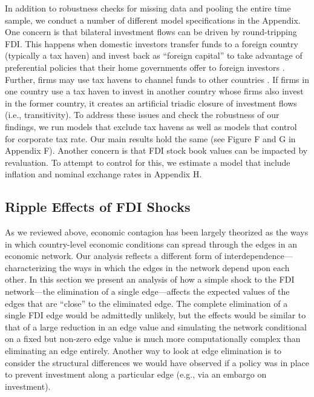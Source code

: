 \documentclass[reqno,onecolumn,letterpaper,12pt]{article}
\begin{document}
In addition to robustness checks for missing data and pooling the entire time sample, we conduct a number of different model specifications in the Appendix. One concern is that bilateral investment flows can be driven by round-tripping FDI. This happens when domestic investors transfer funds to a foreign country (typically a tax haven) and invest back as ``foreign capital'' to take advantage of preferential policies that their home governments offer to foreign investors \citep{Borga:2016}. Further, firms may use tax havens to channel funds to other countries \citep{Borga:2017}. If firms in one country use a tax haven to invest in another country whose firms also invest in the former country, it creates an artificial triadic closure of investment flows (i.e., transitivity). To address these issues and check the robustness of our findings, we run models that exclude tax havens as well as models that control for corporate tax rate. Our main results hold the same (see Figure F and G in Appendix F). Another concern is that FDI stock book values can be impacted by revaluation. To attempt to control for this, we estimate a model that include inflation and nominal exchange rates in Appendix H. 


\subsection{Ripple Effects of FDI Shocks}\label{contagion}

As we reviewed above, economic contagion has been largely theorized as the ways in which country-level economic conditions can spread through the edges in an economic network. Our analysis reflects a different form of interdependence---characterizing the ways in which the edges in the network depend upon each other. In this section we present an analysis of how a simple shock to the FDI network---the elimination of a single edge---affects the expected values of the edges that are ``close'' to the eliminated edge. The complete elimination of a single FDI edge would be admittedly unlikely, but the effects would be similar to that of a large reduction in an edge value and simulating the network conditional on a fixed but non-zero edge value is much more computationally complex than eliminating an edge entirely. Another way to look at edge elimination is to consider the structural differences we would have observed if a policy was in place to prevent investment along a particular edge (e.g., via an embargo on investment).
\end{document}
